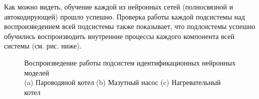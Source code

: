 Как можно видеть, обучение каждой из нейронных сетей (полносвязной и автокодирующей) прошло успешно. Проверка работы каждой подсистемы над воспроизведением всей подсистемы также показывает, что подлсистемы успешно обучились воспроизводить внутренние процессы каждого компонента всей системы (см. рис. ниже).

\begin{figure}[H]
  \centering
  \caption{Воспроизведение работы подсистем идентификационных нейронных моделей\\(a) Пароводяной котел (b) Мазутный насос (c) Нагревательный котел}\label{fig:test:plot:subsystems}
\end{figure}

